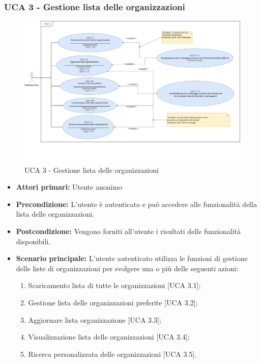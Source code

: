 \subsubsection{UCA 3 - Gestione lista delle organizzazioni}%
\begin{figure}[h]
	\centering
	\includegraphics[scale=0.33]{sezioni/UseCase/Immagini/UCA3.png}
	\caption{UCA 3 - Gestione lista delle organizzazioni}
\end{figure} 

\begin{itemize}
\item \textbf{Attori primari:} Utente anonimo
\item \textbf{Precondizione:} L'utente è autenticato e può accedere alle funzionalità della lista delle organizzazioni.
\item \textbf{Postcondizione:} Vengono forniti all'utente i risultati delle funzionalità disponibili.
\item \textbf{Scenario principale:} L'utente autenticato utilizza le funzioni di gestione delle liste di organizzazioni per svolgere una o più delle seguenti azioni:
	\begin{enumerate}
		\item Scaricamento lista di tutte le organizzazioni [UCA 3.1];
		\item Gestione lista delle organizzazioni preferite [UCA 3.2];
		\item Aggiornare lista organizzazione [UCA 3.3];
		\item Visualizzazione lista delle organizzazioni [UCA 3.4];
		\item Ricerca personalizzata delle organizzazioni [UCA 3.5].
	\end{enumerate}
\end{itemize}



